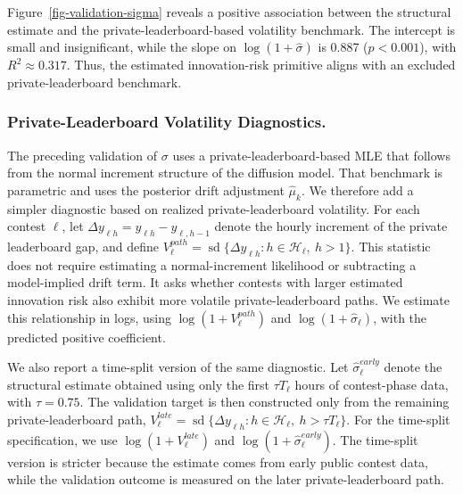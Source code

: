 \documentclass[mnsc]{informs3}
\begin{document}
Figure~\ref{fig-validation-sigma} reveals a positive association between the structural estimate and the private-leaderboard-based volatility benchmark.
The intercept is small and insignificant, while the slope on $\log(1+\hat{\sigma})$ is 0.887 ($p<0.001$), with $R^2\approx0.317$.
Thus, the estimated innovation-risk primitive aligns with an excluded private-leaderboard benchmark.

\subsubsection{Private-Leaderboard Volatility Diagnostics.}
The preceding validation of $\sigma$ uses a private-leaderboard-based MLE that follows from the normal increment structure of the diffusion model.
That benchmark is parametric and uses the posterior drift adjustment $\hat\mu_k$.
We therefore add a simpler diagnostic based on realized private-leaderboard volatility.
For each contest $\ell$, let $\Delta y_{\ell h}=y_{\ell h}-y_{\ell,h-1}$ denote the hourly increment of the private leaderboard gap, and define $V_\ell^{path}=\operatorname{sd}\{\Delta y_{\ell h}:h\in\mathcal H_\ell,\ h>1\}$.
This statistic does not require estimating a normal-increment likelihood or subtracting a model-implied drift term.
It asks whether contests with larger estimated innovation risk also exhibit more volatile private-leaderboard paths.
We estimate this relationship in logs, using $\log(1+V_\ell^{path})$ and $\log(1+\hat\sigma_\ell)$, with the predicted positive coefficient.

We also report a time-split version of the same diagnostic.
Let $\hat\sigma_\ell^{early}$ denote the structural estimate obtained using only the first $\tau T_\ell$ hours of contest-phase data, with $\tau=0.75$.
The validation target is then constructed only from the remaining private-leaderboard path, $V_\ell^{late}=\operatorname{sd}\{\Delta y_{\ell h}:h\in\mathcal H_\ell,\ h>\tau T_\ell\}$.
For the time-split specification, we use $\log(1+V_\ell^{late})$ and $\log(1+\hat\sigma_\ell^{early})$.
The time-split version is stricter because the estimate comes from early public contest data, while the validation outcome is measured on the later private-leaderboard path.
\end{document}

